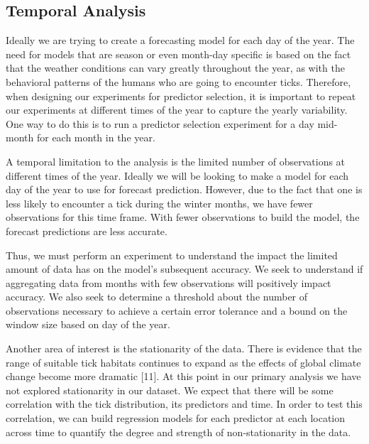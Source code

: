 \subsection{Temporal Analysis}
Ideally we are trying to create a forecasting model for each day of the year. The need for models that are season or even month-day specific is based on the fact that the weather conditions can vary greatly throughout the year, as with the behavioral patterns of the humans who are going to encounter ticks. Therefore, when designing our experiments for predictor selection, it is important to repeat our experiments at different times of the year to capture the yearly variability. One way to do this is to run a predictor selection experiment for a day mid-month for each month in the year. \newline

\noindent A temporal limitation to the analysis is the limited number of observations at different times of the year. Ideally we will be looking to make a model for each day of the year to use for forecast prediction. However, due to the fact that one is less likely to encounter a tick during the winter months, we have fewer observations for this time frame. With fewer observations to build the model, the forecast predictions are less accurate. \newline 

\noindent Thus, we must perform an experiment to understand the impact the limited amount of data has on the model's subsequent accuracy. We seek to understand if aggregating data from months with few observations will positively impact accuracy. We also seek to determine a threshold about the number of observations necessary to achieve a certain error tolerance and a bound on the window size based on day of the year. \newline

\noindent Another area of interest is the stationarity of the data. There is evidence that the range of suitable tick habitats continues to expand as the effects of global climate change become more dramatic [11]. At this point in our primary analysis we have not explored stationarity in our dataset. We expect that there will be some correlation with the tick distribution, its predictors and time. In order to test this correlation, we can build regression models for each predictor at each location across time to quantify the degree and strength of non-stationarity in the data.  \newline


